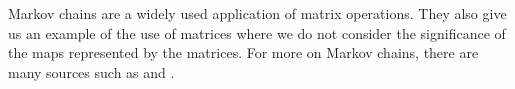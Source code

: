 \begin{center}
\begin{tabular}{@{}r|c@{\markovspacer}c@{\markovspacer}c@{\markovspacer}c@{\markovspacer}c@{\markovspacer}c@{\markovspacer}c@{\markovspacer}c@{}}
\end{tabular}
\end{center}

Markov chains are a 
widely used application of matrix operations.
They also  give us 
an example of the use of matrices where we do not consider
the significance of the maps represented by the matrices.
For more on Markov chains, there are many sources such as
\cite{KemenySnell} and \cite{Iosifescu}.

